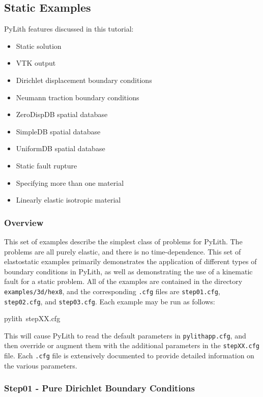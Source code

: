 
\subsection{\label{sec:Tutorial-3d-hex8-static}Static Examples}

PyLith features discussed in this tutorial:
\begin{itemize}
\item Static solution
\item VTK output
\item Dirichlet displacement boundary conditions
\item Neumann traction boundary conditions
\item ZeroDispDB spatial database
\item SimpleDB spatial database
\item UniformDB spatial database
\item Static fault rupture
\item Specifying more than one material
\item Linearly elastic isotropic material
\end{itemize}

\subsubsection{Overview}

This set of examples describe the simplest class of problems for PyLith.
The problems are all purely elastic, and there is no time-dependence.
This set of elastostatic examples primarily demonstrates the application
of different types of boundary conditions in PyLith, as well as demonstrating
the use of a kinematic fault for a static problem. All of the examples
are contained in the directory \texttt{examples/3d/hex8}, and the
corresponding \texttt{.cfg} files are \texttt{step01.cfg}, \texttt{step02.cfg},
and \texttt{step03.cfg}. Each example may be run as follows:
\begin{lyxcode}
pylith~stepXX.cfg
\end{lyxcode}
This will cause PyLith to read the default parameters in \texttt{pylithapp.cfg},
and then override or augment them with the additional parameters in
the \texttt{stepXX.cfg} file. Each \texttt{.cfg} file is extensively
documented to provide detailed information on the various parameters.


\subsubsection{Step01 - Pure Dirichlet Boundary Conditions}

